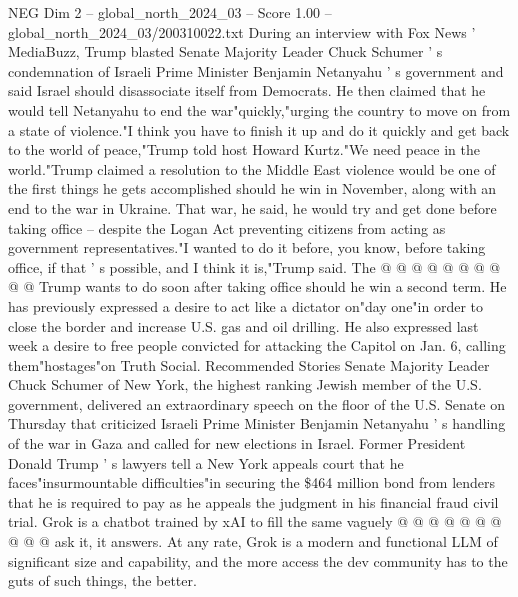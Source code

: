 \begin{textsample}{NEG Dim 2 – global\_north\_2024\_03 – Score 1.00 – global\_north\_2024\_03/200310022.txt}  \label{ex:f2_neg_343}
During an interview with Fox News ' MediaBuzz, Trump blasted Senate Majority Leader Chuck Schumer ' s condemnation of Israeli Prime Minister Benjamin Netanyahu ' s government and said Israel should disassociate itself from Democrats.
He then claimed that he would tell Netanyahu to end the war"quickly,"urging the country to move on from a state of violence."I think you have to finish it up and do it quickly and get back to the world of peace,"Trump told host Howard Kurtz."We need peace in the world."Trump claimed a resolution to the Middle East violence would be one of the first things he gets accomplished should he win in November, along with an end to the war in Ukraine.
That war, he said, he would try and get done before taking office -- despite the Logan Act preventing citizens from acting as government representatives."I wanted to do it before, you know, before taking office, if that ' s possible, and I think it is,"Trump said.
The @ @ @ @ @ @ @ @ @ @ Trump wants to do soon after taking office should he win a second term.
He has previously expressed a desire to act like a dictator on"day one"in order to close the border and increase U.S. gas and oil drilling.
He also expressed last week a desire to free people convicted for attacking the Capitol on Jan. 6, calling them"hostages"on Truth Social.
Recommended Stories Senate Majority Leader Chuck Schumer of New York, the highest ranking Jewish member of the U.S. government, delivered an extraordinary speech on the floor of the U.S.
Senate on Thursday that criticized Israeli Prime Minister Benjamin Netanyahu ' s handling of the war in Gaza and called for new elections in Israel.
Former President Donald Trump ' s lawyers tell a New York appeals court that he faces"insurmountable difficulties"in securing the \$464 million bond from lenders that he is required to pay as he appeals the judgment in his financial fraud civil trial.
Grok is a chatbot trained by xAI to fill the same vaguely @ @ @ @ @ @ @ @ @ @ ask it, it answers.
At any rate, Grok is a modern and functional LLM of significant size and capability, and the more access the dev community has to the guts of such things, the better.

\end{textsample}
